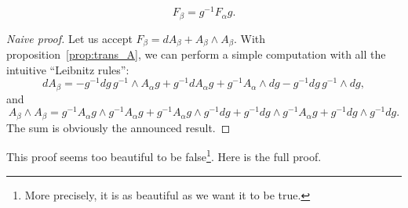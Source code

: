 \begin{theorem}
	\begin{equation}
		F_{\beta}=g^{-1} F_{\alpha} g.
	\end{equation}
	\label{tho:trans_F}
\end{theorem}

\begin{proof}[Naive proof]
	Let us accept $F_{\beta}=dA_{\beta}+A_{\beta}\wedge A_{\beta}$. With proposition~\ref{prop:trans_A}, we can perform a simple computation with all the intuitive ``Leibnitz rules'':
	\[
		dA_{\beta}=-g^{-1} dg\, g^{-1}\wedge A_{\alpha} g+g^{-1} dA_{\alpha} g+g^{-1} A_{\alpha}\wedge dg-g^{-1} dg\,g^{-1}\wedge dg,
	\]
	and
	\[
		A_{\beta}\wedge A_{\beta}=g^{-1} A_{\alpha} g\wedge g^{-1} A_{\alpha} g+g^{-1} A_{\alpha} g\wedge g^{-1} dg+g^{-1} dg\wedge g^{-1} A_{\alpha} g+g^{-1} dg\wedge g^{-1} dg.
	\]
	The sum is obviously the announced result.
\end{proof}
This proof seems too beautiful to be false\footnote{More precisely, it is as beautiful as we want it to be true.}. Here is the full proof.

